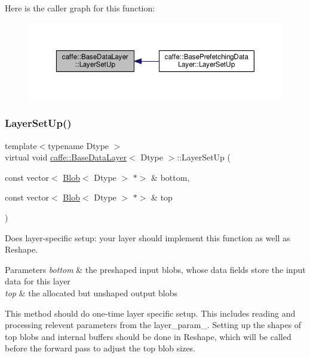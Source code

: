 Here is the caller graph for this function\+:
\nopagebreak
\begin{figure}[H]
\begin{center}
\leavevmode
\includegraphics[width=350pt]{classcaffe_1_1_base_data_layer_a7028919adf87326b808a2c7b21e8e927_icgraph}
\end{center}
\end{figure}
\mbox{\label{classcaffe_1_1_base_data_layer_a72276185eb4e5495de2d0e0d34bc8eda}} 
\subsubsection{\texorpdfstring{Layer\+Set\+Up()}{LayerSetUp()}\hspace{0.1cm}{\footnotesize\ttfamily [2/2]}}
{\footnotesize\ttfamily template$<$typename Dtype $>$ \\
virtual void \mbox{\hyperlink{classcaffe_1_1_base_data_layer}{caffe\+::\+Base\+Data\+Layer}}$<$ Dtype $>$\+::Layer\+Set\+Up (\begin{DoxyParamCaption}\item[{const vector$<$ \mbox{\hyperlink{classcaffe_1_1_blob}{Blob}}$<$ Dtype $>$ $\ast$$>$ \&}]{bottom,  }\item[{const vector$<$ \mbox{\hyperlink{classcaffe_1_1_blob}{Blob}}$<$ Dtype $>$ $\ast$$>$ \&}]{top }\end{DoxyParamCaption})\hspace{0.3cm}{\ttfamily [virtual]}}



Does layer-\/specific setup\+: your layer should implement this function as well as Reshape. 


\begin{DoxyParams}{Parameters}
{\em bottom} & the preshaped input blobs, whose data fields store the input data for this layer \\
\hline
{\em top} & the allocated but unshaped output blobs\\
\hline
\end{DoxyParams}
This method should do one-\/time layer specific setup. This includes reading and processing relevent parameters from the {\ttfamily layer\+\_\+param\+\_\+}. Setting up the shapes of top blobs and internal buffers should be done in {\ttfamily Reshape}, which will be called before the forward pass to adjust the top blob sizes. 

